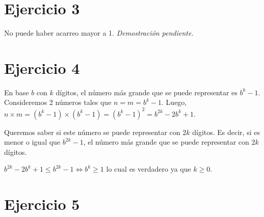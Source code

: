 \section{Ejercicio 3}

No puede haber acarreo mayor a 1. \emph{Demostración pendiente.}

\section{Ejercicio 4}

En base $b$ con $k$ dígitos, el número más grande que se puede representar es $b^k - 1$. Consideremos 2 números tales que $n = m = b^k - 1$. Luego, $n \times m = (b^k - 1) \times (b^k - 1) = (b^k - 1)^2 = b^{2k} - 2b^k + 1$.

Queremos saber si este número se puede representar con $2k$ dígitos. Es decir, si es menor o igual que $b^{2k} - 1$, el número más grande que se puede representar con $2k$ dígitos.

$b^{2k} - 2b^k + 1 \leq b^{2k} - 1 \iff b^k \geq 1$ lo cual es verdadero ya que $k \geq 0$.

\section{Ejercicio 5}

